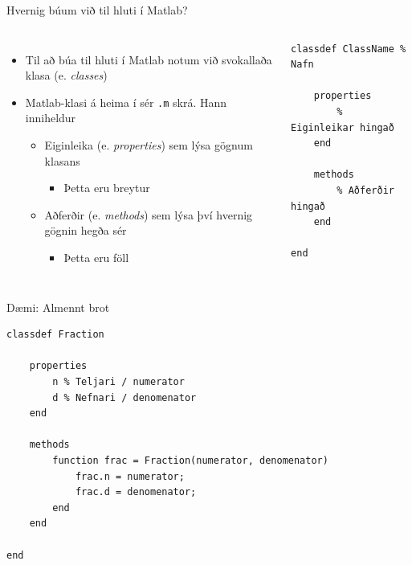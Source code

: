 \documentclass{beamer}
\begin{document}
\begin{frame}[fragile]{Hvernig búum við til hluti í Matlab?}
\begin{columns}
\begin{itemize}
 \item Til að búa til hluti í Matlab notum við svokallaða klasa (e. \emph{classes})
 \item Matlab-klasi á heima í sér \texttt{.m} skrá. Hann inniheldur
 \begin{itemize}
  \item Eiginleika (e. \emph{properties}) sem lýsa gögnum klasans
  \begin{itemize}
   \item Þetta eru breytur
  \end{itemize}
  \item Aðferðir (e. \emph{methods}) sem lýsa því hvernig gögnin hegða sér
  \begin{itemize}
   \item Þetta eru föll
  \end{itemize}
 \end{itemize}
\end{itemize}
\begin{verbatim}
classdef ClassName % Nafn

    properties
        % Eiginleikar hingað
    end
    
    methods
        % Aðferðir hingað
    end
    
end
\end{verbatim}

\end{columns}
\end{frame}

\begin{frame}[fragile]{Dæmi: Almennt brot}
\begin{verbatim}
classdef Fraction

    properties
        n % Teljari / numerator
        d % Nefnari / denomenator
    end
    
    methods
        function frac = Fraction(numerator, denomenator)
            frac.n = numerator;
            frac.d = denomenator;
        end
    end
    
end
\end{verbatim}

\end{frame}
\end{document}
